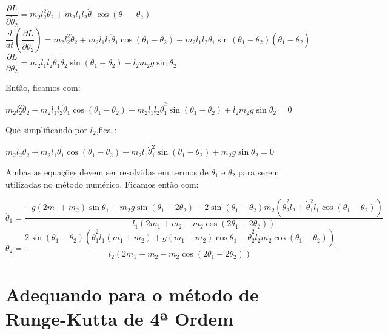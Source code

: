 \documentclass[13pt,a4paper]{report}
\begin{document}
\begin{center}
$
\dfrac{\partial L}{\partial \dot{\theta}_{2}} =
m_{2}l_{2}^{2}\dot{\theta}_{2} +
m_{2}l_{1}l_{2}\dot{\theta}_{1}\cos\left(\theta_{1} - \theta_{2}\right)
$
\\[2mm]
$
\dfrac{d}{dt}\left(\dfrac{\partial L}{\partial\dot{\theta}_{2}}\right) = m_{2}l_{2}^{2}\ddot{\theta}_{2} + m_{2}l_{1}l_{2}\ddot{\theta}_{1}\cos\left(\theta_{1} - \theta_{2}\right) - m_{2}l_{1}l_{2}\dot{\theta}_{1}\sin\left(\theta_{1} -\theta_{2}\right)\left(\dot{\theta}_{1} - \dot{\theta}_{2} \right)
$
\\[2mm]
$
\dfrac{\partial L}{\partial \theta_{2}} =
m_{2}l_{1}l_{2}\dot{\theta}_{1}\dot{\theta}_{2}
\sin\left(\theta_{1} - \theta_{2}\right) -
l_{2}m_{2}g\sin\theta_{2}
$
\end{center}
Então, ficamos com:
\begin{center}
$
m_{2}l_{2}^{2}\ddot{\theta}_{2} +
m_{2}l_{1}l_{2}\ddot{\theta}_{1}\cos\left(\theta_{1} - \theta_{2}\right)
-m_{2}l_{1}l_{2}\dot{\theta}_{1}^{2}\sin\left(\theta_{1} - \theta_{2}\right)
+ l_{2}m_{2}g\sin\theta_{2} = 0
$
\end{center}
Que simplificando por $l_{2}$,fica :
\begin{center}
$
m_{2}l_{2}\ddot{\theta}_{2} +
m_{2}l_{1}\ddot{\theta}_{1}\cos\left(\theta_{1} - \theta_{2}\right)
-m_{2}l_{1}\dot{\theta}_{1}^{2}\sin\left(\theta_{1} - \theta_{2}\right)
+ m_{2}g\sin\theta_{2} = 0
$
\end{center}
Ambas as equações devem ser resolvidas em termos de $\ddot{\theta}_{1}$ e $\ddot{\theta}_{2}$ para serem utilizadas no método numérico.
Ficamos então com:
\begin{center}
$
{\ddot{\theta}_{1} = 
\dfrac{-g\left(2m_{1} + m_{2}\right)\sin\theta_{1}
-m_{2}g\sin\left(\theta_{1}	-2\theta_{2}\right)
-2\sin\left(\theta_{1} -\theta_{2}\right)
m_{2}\left(\dot{\theta}_{2}^{2}l_{2} + \dot{\theta}_{1}^{2}l_{1}\cos\left(\theta_{1} -\theta_{2}\right)\right)}{l_{1}\left(2m_{1} + m_{2} -m_{2}\cos\left(2\theta_{1}- 2\theta_{2}\right)\right)}}
$
\\[2mm]
$
{\ddot{\theta_{2}} = 
\dfrac{2\sin\left(\theta_{1} - \theta_{2}\right)\left(
\dot{\theta}_{1}^{2}l_{1}\left(m_{1} + m_{2}\right) +
g\left(m_{1} + m_{2}\right)\cos\theta_{1} + \dot{\theta}_{2}^{2}l_{2}m_{2}\cos\left(
\theta_{1} - \theta_{2}\right)\right)}{l_{2}\left(2m_{1} + m_{2} -m_{2}\cos\left(2\theta_{1}- 2\theta_{2}\right)\right)}}
$
\end{center}
\clearpage

\section{Adequando para o método de Runge-Kutta de 4ª Ordem}
\end{document}
